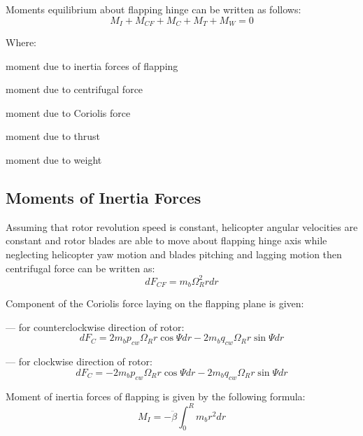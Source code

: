 \begin{minipage}{\textwidth}
  Moments equilibrium about flapping hinge can be written as follows: \cite{GessowMyers1985}
  \begin{equation}
    \label{eq-aero-blade-moments-equilibrium}
    M_I + M_{CF} + M_C + M_T + M_W = 0
  \end{equation}

  Where:
  \begin{description}[align=right,labelwidth=1.5cm]
    \item [$M_I$]    [N$\cdot$m] moment due to inertia forces of flapping
    \item [$M_{CF}$] [N$\cdot$m] moment due to centrifugal force
    \item [$M_C$]    [N$\cdot$m] moment due to Coriolis force
    \item [$M_T$]    [N$\cdot$m] moment due to thrust
    \item [$M_W$]    [N$\cdot$m] moment due to weight
  \end{description}
\end{minipage}

\subsection{Moments of Inertia Forces}

Assuming that rotor revolution speed is constant, helicopter angular velocities are constant and rotor blades are able to move about flapping hinge axis while neglecting helicopter yaw motion and blades pitching and lagging motion then centrifugal force can be written as:
\begin{equation}
  dF_{CF} = m_b \Omega_R^2 r dr
\end{equation}

Component of the Coriolis force laying on the flapping plane is given:

--- for counterclockwise direction of rotor:
\begin{equation}
  dF_C =
    2 m_b p_{cw} \Omega_R r \cos \Psi dr
  - 2 m_b q_{cw} \Omega_R r \sin \Psi dr
\end{equation}

--- for clockwise direction of rotor:
\begin{equation}
  dF_C =
  - 2 m_b p_{cw} \Omega_R r \cos \Psi dr
  - 2 m_b q_{cw} \Omega_R r \sin \Psi dr
\end{equation}

Moment of inertia forces of flapping is given by the following formula:
\begin{equation}
  M_I = - \ddot \beta \int_{0}^{R} m_b r^2 dr
\end{equation}

